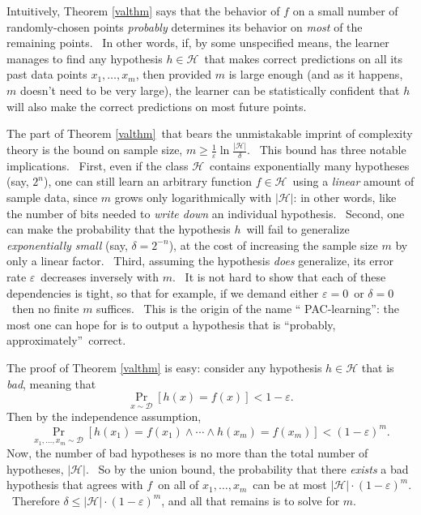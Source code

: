 \documentclass[11pt,onecolumn]{article}%
\begin{document}
Intuitively, Theorem \ref{valthm} says that the behavior of $f$ on a small
number of randomly-chosen points \textit{probably} determines its behavior on
\textit{most} of the remaining points. \ In other words, if, by some
unspecified means, the learner manages to find any hypothesis $h\in
\mathcal{H}$\ that makes correct predictions on all its past data points
$x_{1},\ldots,x_{m}$, then provided $m$ is large enough (and as it happens,
$m$ doesn't need to be very large), the learner can be statistically confident
that $h$ will also make the correct predictions on most future points.

The part of Theorem \ref{valthm}\ that bears the unmistakable imprint of
complexity theory is the bound on sample size, $m\geq\frac{1}{\varepsilon}%
\ln\frac{\left\vert \mathcal{H}\right\vert }{\delta}$. \ This bound has three
notable implications. \ First, even if the class $\mathcal{H}$\ contains
exponentially many hypotheses (say, $2^{n}$), one can still learn an arbitrary
function $f\in\mathcal{H}$\ using a \textit{linear} amount of sample data,
since $m$ grows only logarithmically with $\left\vert \mathcal{H}\right\vert
$: in other words, like the number of bits needed to \textit{write down} an
individual hypothesis. \ Second, one can make the probability that the
hypothesis $h$\ will fail to generalize \textit{exponentially small} (say,
$\delta=2^{-n}$), at the cost of increasing the sample size $m$ by only a
linear factor. \ Third, assuming the hypothesis \textit{does} generalize, its
error rate $\varepsilon$\ decreases inversely with $m$. \ It is not hard to
show that each of these dependencies is tight, so that for example, if we
demand either $\varepsilon=0$\ or $\delta=0$\ then no finite $m$ suffices.
\ This is the origin of the name \textquotedblleft
PAC-learning\textquotedblright: the most one can hope for is to output a
hypothesis that is \textquotedblleft probably, approximately\textquotedblright\ correct.

The proof of Theorem \ref{valthm} is easy: consider any hypothesis
$h\in\mathcal{H}$ that is \textit{bad}, meaning that%
\[
\Pr_{x\sim\mathcal{D}}\left[  h\left(  x\right)  =f\left(  x\right)  \right]
<1-\varepsilon.
\]
Then by the independence assumption,%
\[
\Pr_{x_{1},\ldots,x_{m}\sim\mathcal{D}}\left[  h\left(  x_{1}\right)
=f\left(  x_{1}\right)  \wedge\cdots\wedge h\left(  x_{m}\right)  =f\left(
x_{m}\right)  \right]  <\left(  1-\varepsilon\right)  ^{m}.
\]
Now, the number of bad hypotheses is no more than the total number of
hypotheses, $\left\vert \mathcal{H}\right\vert $. \ So by the union bound, the
probability that there \textit{exists} a bad hypothesis that agrees with
$f$\ on all of $x_{1},\ldots,x_{m}$\ can be at most $\left\vert \mathcal{H}%
\right\vert \cdot\left(  1-\varepsilon\right)  ^{m}$. \ Therefore $\delta
\leq\left\vert \mathcal{H}\right\vert \cdot\left(  1-\varepsilon\right)  ^{m}%
$, and all that remains is to solve for $m$.
\end{document}
